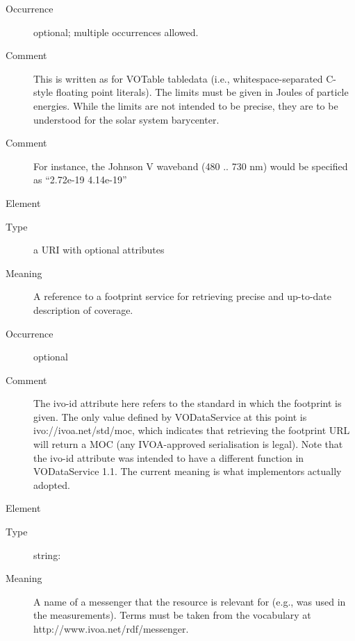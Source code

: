\documentclass[11pt,a4paper]{ivoa}
\begin{document}
\begin{generated}
\begin{bigdescription}
\begin{description}
\item[Occurrence] optional; multiple occurrences allowed.

\item[Comment]
                  This is written as for VOTable tabledata (i.e.,
                  whitespace-separated C-style floating point literals).
                  The limits must be given in Joules of particle
                  energies.  While the limits are not intended
                  to be precise, they are to be understood for the
                  solar system barycenter.

\item[Comment]
                  For instance, the Johnson V waveband (480 .. 730 nm)
                  would be specified as “2.72e-19 4.14e-19”


\end{description}
\item[Element \xmlel{footprint}]
\begin{description}
\item[Type] a URI with optional attributes
\item[Meaning]
                  A reference to a footprint service for retrieving
                  precise and up-to-date description of coverage.

\item[Occurrence] optional
\item[Comment]
                  The ivo-id attribute here refers to the standard in which
                  the footprint is given.  The only value defined by
                  VODataService at this point is ivo://ivoa.net/std/moc,
                  which indicates that retrieving the footprint URL will return
                  a MOC (any IVOA-approved serialisation is legal).  Note that
                  the ivo-id attribute was intended to have a different
                  function in VODataService 1.1.  The current meaning is what
                  implementors actually adopted.


\end{description}
\item[Element \xmlel{waveband}]
\begin{description}
\item[Type] string: 
\item[Meaning]
                  A name of a messenger that the resource is relevant for
                  (e.g., was used in the measurements).  Terms must
                  be taken from the vocabulary at
                  http://www.ivoa.net/rdf/messenger.


\end{description}
\end{bigdescription}
\end{generated}
\end{document}
